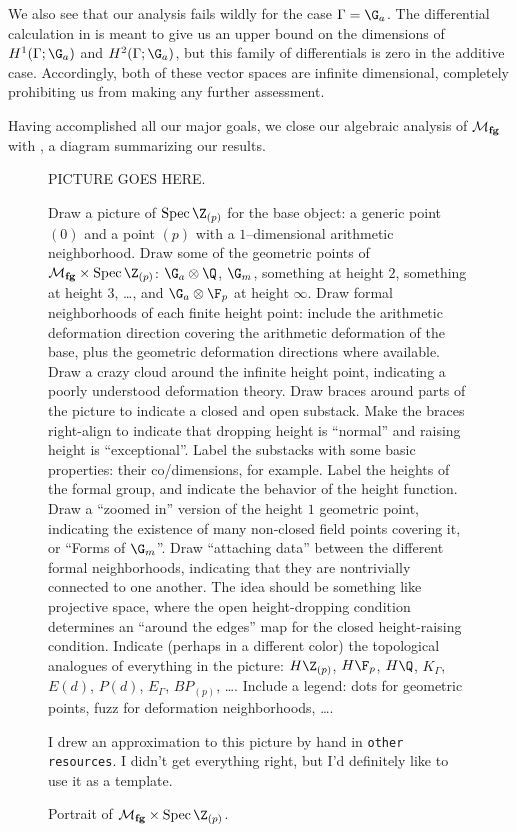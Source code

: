 \begin{remark}
We also see that our analysis fails wildly for the case $\Gamma = \G_a$.  The differential calculation in  is meant to give us an upper bound on the dimensions of $H^1(\Gamma; \G_a)$ and $H^2(\Gamma; \G_a)$, but this family of differentials is zero in the additive case.  Accordingly, both of these vector spaces are infinite dimensional, completely prohibiting us from making any further assessment.
\end{remark}

Having accomplished all our major goals, we close our algebraic analysis of $\mathcal{M}_{\mathbf{fg}}$ with , a diagram summarizing our results.
\begin{sidewaysfigure}
\centering
PICTURE GOES HERE.

\vspace{\baselineskip}
Draw a picture of $\Spec \Z_{(p)}$ for the base object: a generic point $(0)$ and a point $(p)$ with a $1$--dimensional arithmetic neighborhood.
Draw some of the geometric points of $\moduli{fg} \times \Spec \Z_{(p)}$: $\G_a \otimes \Q$, $\G_m$, something at height $2$, something at height $3$, \ldots, and $\G_a \otimes \F_p$ at height $\infty$.
Draw formal neighborhoods of each finite height point: include the arithmetic deformation direction covering the arithmetic deformation of the base, plus the geometric deformation directions where available.
Draw a crazy cloud around the infinite height point, indicating a poorly understood deformation theory.
Draw braces around parts of the picture to indicate a closed and open substack.  Make the braces right-align to indicate that dropping height is ``normal'' and raising height is ``exceptional''.  Label the substacks with some basic properties: their co/dimensions, for example.
Label the heights of the formal group, and indicate the behavior of the height function.
Draw a ``zoomed in'' version of the height $1$ geometric point, indicating the existence of many non-closed field points covering it, or ``Forms of $\G_m$''.
Draw ``attaching data'' between the different formal neighborhoods, indicating that they are nontrivially connected to one another.  The idea should be something like projective space, where the open height-dropping condition determines an ``around the edges'' map for the closed height-raising condition.
Indicate (perhaps in a different color) the topological analogues of everything in the picture: $H\Z_{(p)}$, $H\F_p$, $H\Q$, $K_\Gamma$, $E(d)$, $P(d)$, $E_\Gamma$, $BP_{(p)}$, \ldots.
Include a legend: dots for geometric points, fuzz for deformation neighborhoods, \ldots.

\vspace{\baselineskip}
I drew an approximation to this picture by hand in \texttt{other resources}.  I didn't get everything right, but I'd definitely like to use it as a template.
\caption{Portrait of $\moduli{fg} \times \Spec \Z_{(p)}$.}\label{MfgPicture}
\end{sidewaysfigure}


